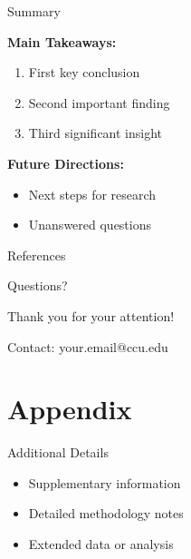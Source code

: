 \documentclass[
  12pt,
  aspectratio=169,  %
  t,                %
  ignorenonframetext %
]{beamer}
\begin{document}
\begin{frame}{Summary}

  \textbf{Main Takeaways:}
  \begin{enumerate}
    \item First key conclusion
    \item Second important finding
    \item Third significant insight
  \end{enumerate}

  \vspace{1em}

  \textbf{Future Directions:}
  \begin{itemize}
    \item Next steps for research
    \item Unanswered questions
  \end{itemize}

\end{frame}

\begin{frame}[allowframebreaks]{References}
  \printbibliography[heading=none]
\end{frame}

\begin{frame}{Questions?}

  \begin{center}
    \Large Thank you for your attention!

    \vspace{2em}

    \normalsize
    Contact: your.email@ccu.edu
  \end{center}

\end{frame}

\appendix

\section{Appendix}

\begin{frame}[noframenumbering]{Additional Details}

  \begin{itemize}
    \item Supplementary information
    \item Detailed methodology notes
    \item Extended data or analysis
  \end{itemize}

\end{frame}
\end{document}
